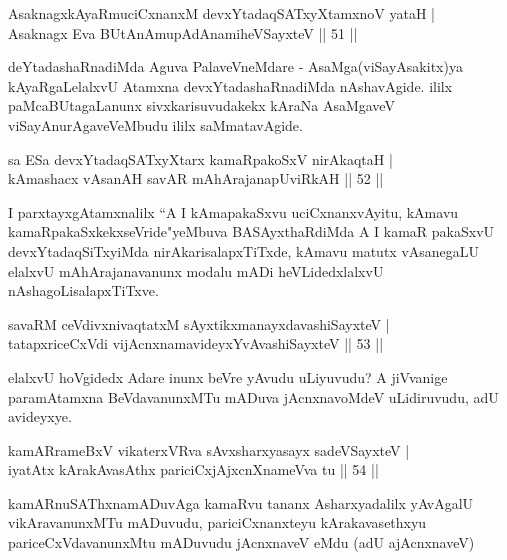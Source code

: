 \begin{shl}
AsaknagxkAyaRmuciCxnanxM devxYtadaqSATxyX\s \s tamxnoV yataH |\\
Asaknagx Eva BUtAnAmupAdAnamiheVSayxteV \hfill || 51 ||
\end{shl}

\begin{artha}
deYtadashaRnadiMda Aguva PalaveVneMdare - AsaMga(viSayAsakitx)ya kAyaRgaLelalxvU Atamxna  devxYtadashaRnadiMda nAshavAgide. ililx paMcaBUtagaLanunx sivxkarisuvudakekx kAraNa AsaMgaveV viSayAnurAgaveVeMbudu ililx saMmatavAgide.
\end{artha}

\begin{shl}
sa ESa devxYtadaqSATxyX\s tarx kamaRpakoSxV nirAkaqtaH |\\
kAmashacx vAsanAH savAR mAhArajanapUviRkAH \hfill || 52 ||
\end{shl}

\begin{artha}
I parxtayxgAtamxnalilx ``A I kAmapakaSxvu uciCxnanxvAyitu, kAmavu kamaRpakaSxkekxseVride"yeMbuva BASAyxthaRdiMda A I kamaR pakaSxvU devxYtadaqSiTxyiMda nirAkarisalapxTiTxde, kAmavu matutx vAsanegaLU elalxvU mAhArajanavanunx modalu mADi heVLidedxlalxvU nAshagoLisalapxTiTxve.
\end{artha}

\begin{shl}
savaRM ceVdivxnivaqtatxM sAyxtikxmanayxdavashiSayxteV |\\
tatapxriceCxVdi vijAcnxnamavideyxYvAvashiSayxteV \hfill || 53 ||
\end{shl}

\begin{artha}
elalxvU hoVgidedx Adare inunx beVre yAvudu uLiyuvudu? A jiVvanige paramAtamxna BeVdavanunxMTu  mADuva jAcnxnavoMdeV uLidiruvudu, adU avideyxye.
\end{artha}

\begin{shl}
kamAR\s \s rameBxV vikaterxVRva sAvxsharxyasayx sadeVSayxteV |\\
iyatAtx kArakAvasAthx pariciCxjAjxcnXnameVva tu \hfill || 54 ||
\end{shl}

\begin{artha}
kamARnuSAThxnamADuvAga kamaRvu tananx Asharxyadalilx yAvAgalU vikAravanunxMTu mADuvudu, pariciCxnanxteyu kArakavasethxyu pariceCxVdavanunxMtu mADuvudu jAcnxnaveV eMdu (adU ajAcnxnaveV)
\end{artha}

